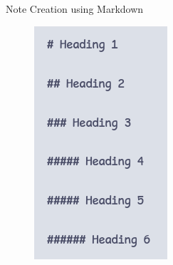 \documentclass[10pt, xcolor=dvipsnames]{beamer}
\begin{document}
\begin{frame}{Note Creation using Markdown}
\begin{figure}
\begin{minipage}{.32\textwidth}
				\includegraphics[width=.95\linewidth]{../latex-image/markdown-code3}
			\end{minipage}%
		\end{figure}
	\end{frame}
\end{document}
